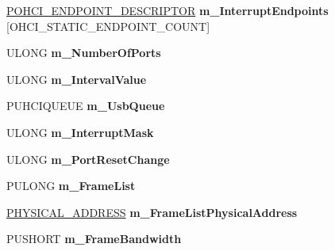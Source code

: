 \begin{DoxyCompactItemize}
\hyperlink{struct___o_h_c_i___e_n_d_p_o_i_n_t___d_e_s_c_r_i_p_t_o_r}{P\+O\+H\+C\+I\+\_\+\+E\+N\+D\+P\+O\+I\+N\+T\+\_\+\+D\+E\+S\+C\+R\+I\+P\+T\+OR} {\bfseries m\+\_\+\+Interrupt\+Endpoints} \mbox{[}O\+H\+C\+I\+\_\+\+S\+T\+A\+T\+I\+C\+\_\+\+E\+N\+D\+P\+O\+I\+N\+T\+\_\+\+C\+O\+U\+NT\mbox{]}
\item 
\mbox{\label{class_c_u_s_b_hardware_device_a988c8a5759ad535eaa73be46c962020d}} 
U\+L\+O\+NG {\bfseries m\+\_\+\+Number\+Of\+Ports}
\item 
\mbox{\label{class_c_u_s_b_hardware_device_a7e29acfe0dde33f27cfa2798dce85720}} 
U\+L\+O\+NG {\bfseries m\+\_\+\+Interval\+Value}
\item 
\mbox{\label{class_c_u_s_b_hardware_device_a4d200578efa2369e29c3f20ac61edf7c}} 
P\+U\+H\+C\+I\+Q\+U\+E\+UE {\bfseries m\+\_\+\+Usb\+Queue}
\item 
\mbox{\label{class_c_u_s_b_hardware_device_aa43f04fbc9961d738a161894eeaace7f}} 
U\+L\+O\+NG {\bfseries m\+\_\+\+Interrupt\+Mask}
\item 
\mbox{\label{class_c_u_s_b_hardware_device_a0e261829abc8bf266dbf52df997fbfd5}} 
U\+L\+O\+NG {\bfseries m\+\_\+\+Port\+Reset\+Change}
\item 
\mbox{\label{class_c_u_s_b_hardware_device_a1cf209082f036a1508d4794936d9fd54}} 
P\+U\+L\+O\+NG {\bfseries m\+\_\+\+Frame\+List}
\item 
\mbox{\label{class_c_u_s_b_hardware_device_ab00a601ef2ed6caa6e0ded9f013d9ad6}} 
\hyperlink{union___l_a_r_g_e___i_n_t_e_g_e_r}{P\+H\+Y\+S\+I\+C\+A\+L\+\_\+\+A\+D\+D\+R\+E\+SS} {\bfseries m\+\_\+\+Frame\+List\+Physical\+Address}
\item 
\mbox{\label{class_c_u_s_b_hardware_device_a94d761ab8f641c14a346358681d0edb5}} 
P\+U\+S\+H\+O\+RT {\bfseries m\+\_\+\+Frame\+Bandwidth}
\item 
\mbox{\label{class_c_u_s_b_hardware_device_a81e70fb06c6479d03ae3442db76502d2}} 

\end{DoxyCompactItemize}
